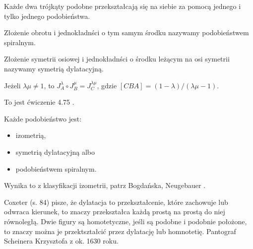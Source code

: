 \begin{proposition}
    Każde dwa trójkąty podobne przekształcają się na siebie za pomocą jednego i tylko jednego podobieństwa.
\end{proposition}


\begin{definition}
    Złożenie obrotu i jednokładnści o tym samym środku nazywamy podobieństwem spiralnym.
\end{definition}

\begin{definition}
    Złożenie symetrii osiowej i jednokładnści o środku leżącym na osi symetrii nazywamy symetrią dylatacyjną.
\end{definition}

\begin{proposition}
    Jeżeli $\lambda \mu \neq 1$, to $J_A^\lambda \circ J_B^\mu = J_C^{\lambda \mu}$, gdzie $[CBA] = (1-\lambda) / (\lambda \mu - 1)$.
\end{proposition}

To jest ćwiczenie 4.75 \cite[s. 217]{neugebauer_2018}.

\begin{proposition}
    Każde podobieństwo jest:
    \begin{itemize}
        \item izometrią,
        \item symetrią dylatacyjną albo
        \item podobieństwem spiralnym.
    \end{itemize}
\end{proposition}

Wynika to z klasyfikacji izometrii, patrz Bogdańska, Neugebauer \cite[s. 220]{neugebauer_2018}.

Coxeter (s. 84) pisze, że dylatacja to przekształcenie, które zachowuje lub odwraca kierunek, to znaczy przekształca każdą prostą na prostą do niej równoległą.
Dwie figury są homotetyczne, jeśli są podobne i podobnie położone, to znaczy można je przektształcić przez dylatację lub homnotetię.
Pantograf Scheinera Krzysztofa z ok. 1630 roku.
